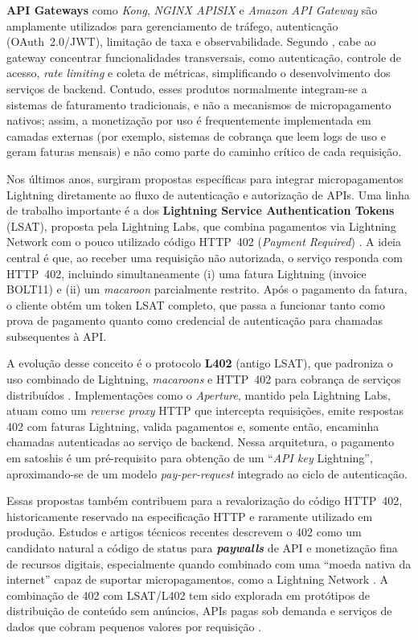 \documentclass[openright]{normas-utf-tex}
\begin{document}
\textbf{API Gateways} como \textit{Kong}, \textit{NGINX APISIX} e \textit{Amazon API Gateway} são amplamente utilizados para gerenciamento de tráfego, autenticação (OAuth~2.0/JWT), limitação de taxa e observabilidade. Segundo , cabe ao gateway concentrar funcionalidades transversais, como autenticação, controle de acesso, \textit{rate limiting} e coleta de métricas, simplificando o desenvolvimento dos serviços de backend. Contudo, esses produtos normalmente integram-se a sistemas de faturamento tradicionais, e não a mecanismos de micropagamento nativos; assim, a monetização por uso é frequentemente implementada em camadas externas (por exemplo, sistemas de cobrança que leem logs de uso e geram faturas mensais) e não como parte do caminho crítico de cada requisição.

Nos últimos anos, surgiram propostas específicas para integrar micropagamentos Lightning diretamente ao fluxo de autenticação e autorização de APIs. Uma linha de trabalho importante é a dos \textbf{Lightning Service Authentication Tokens} (LSAT), proposta pela Lightning Labs, que combina pagamentos via Lightning Network com o pouco utilizado código HTTP~402 (\textit{Payment Required}) \cite{lsat,llsat_tierion}. A ideia central é que, ao receber uma requisição não autorizada, o serviço responda com HTTP~402, incluindo simultaneamente (i) uma fatura Lightning (invoice BOLT11) e (ii) um \textit{macaroon} parcialmente restrito. Após o pagamento da fatura, o cliente obtém um token LSAT completo, que passa a funcionar tanto como prova de pagamento quanto como credencial de autenticação para chamadas subsequentes à API.

A evolução desse conceito é o protocolo \textbf{L402} (antigo LSAT), que padroniza o uso combinado de Lightning, \textit{macaroons} e HTTP~402 para cobrança de serviços distribuídos \cite{l402spec,l402docs}. Implementações como o \textit{Aperture}, mantido pela Lightning Labs, atuam como um \textit{reverse proxy} HTTP que intercepta requisições, emite respostas 402 com faturas Lightning, valida pagamentos e, somente então, encaminha chamadas autenticadas ao serviço de backend. Nessa arquitetura, o pagamento em satoshis é um pré-requisito para obtenção de um “\textit{API key} Lightning”, aproximando-se de um modelo \textit{pay-per-request} integrado ao ciclo de autenticação.

Essas propostas também contribuem para a revalorização do código HTTP~402, historicamente reservado na especificação HTTP e raramente utilizado em produção. Estudos e artigos técnicos recentes descrevem o 402 como um candidato natural a código de status para \textbf{\textit{paywalls}} de API e monetização fina de recursos digitais, especialmente quando combinado com uma “moeda nativa da internet” capaz de suportar micropagamentos, como a Lightning Network \cite{http402study,http402lsat}. A combinação de 402 com LSAT/L402 tem sido explorada em protótipos de distribuição de conteúdo sem anúncios, APIs pagas sob demanda e serviços de dados que cobram pequenos valores por requisição \cite{lsatproxy}.
\end{document}
